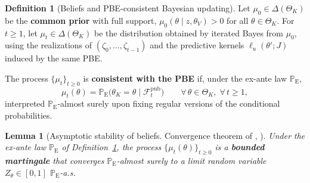 \documentclass[ecta,nameyear,final,supplement]{econsocart}
\numberwithin{equation}{section}
\numberwithin{table}{section}
\newtheorem{lemma}[theorem]{Lemma}
\theoremstyle{definition}
\newtheorem{definition}[theorem]{Definition}
\newcommand{\ProbE}{\mathbb{P}_{\mathrm{E}}}
\begin{document}
\bigskip

\begin{definition}[Beliefs and PBE-consistent Bayesian updating]
\label{def:beliefs-martingale}
Let $\mu_0\in\Delta(\Theta_K)$ be the \textbf{common prior} with full support,
$\mu_0(\theta\mid z,\theta_V)>0$ for all $\theta\in\Theta_K$.
For $t\ge 1$, let $\mu_t\in\Delta(\Theta_K)$ be the distribution obtained by
iterated Bayes from $\mu_0$, using the realizations of
$(\zeta_0,\ldots,\zeta_{t-1})$ and the predictive kernels
$\ell_u(\theta';J)$ induced by the same PBE.

The process $\{\mu_t\}_{t\ge 0}$ is \textbf{consistent with the PBE} if, under
the ex-ante law $\ProbE$,
\begin{equation}
\label{eq:beliefs-ebp-consistency}
\mu_t(\theta)
=\ProbE\bigl(\theta_K=\theta\mid\mathcal{F}_t^{\mathrm{pub}}\bigr)
\qquad\forall\,\theta\in\Theta_K,\;\forall\,t\ge 1,
\end{equation}
interpreted $\ProbE$-almost surely upon fixing regular versions of the
conditional probabilities.
\end{definition}

\bigskip

\begin{lemma}[Asymptotic stability of beliefs. Convergence theorem of
\citeauthor{Doob1953Stochastic}, \citeyear{Doob1953Stochastic}]
\label{lem:asymptotic-beliefs}
Under the ex-ante law $\ProbE$ of
Definition~\ref{def:beliefs-martingale}, the process
$\{\mu_t(\theta)\}_{t\ge 0}$ is a \textbf{bounded martingale} that converges
$\ProbE$-almost surely to a limit random variable
$Z_\theta\in[0,1]$ $\ProbE$-a.s.
\end{lemma}
\end{document}
